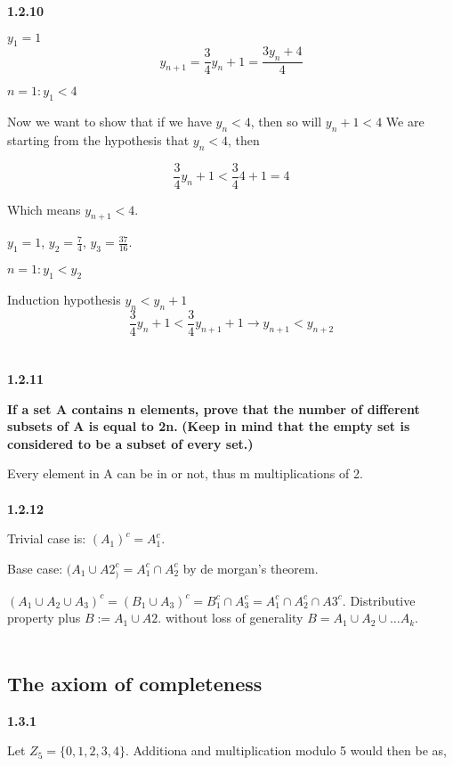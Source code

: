 \textbf{1.2.10}

$y_1 = 1$
$$
y_{n+1} = \frac{3}{4} y_n + 1 = \frac{3y_n + 4}{4}
$$

$n=1: y_1 < 4$

Now we want to show that if we have $y_n < 4$, then so will $y_n+1 < 4$
We are starting from the hypothesis that $y_n < 4$, then

$$
\frac{3}{4} y_n + 1 < \frac{3}{4} 4 + 1 = 4
$$

Which means $y_{n+1} < 4$.

$y_1 = 1$, $y_2 = \frac{7}{4}$, $y_3 = \frac{37}{16}$.

$n=1: y_1 < y_2$

Induction hypothesis $y_n < y_n+1$
$$
\frac{3}{4}  y_n + 1 < \frac{3}{4}  y_{n+1} + 1 \rightarrow y_{n+1} < y_{n+2}
$$
\\~\\



\textbf{1.2.11}

\textbf{If a set A contains n elements, prove that the number of different subsets of A is equal to 2n.}
\textbf{(Keep in mind that the empty set is considered to be a subset of every set.)}

Every element in A can be in or not, thus m multiplications of 2.
\\~\\


\textbf{1.2.12}

Trivial case is: $(A_1)^c  = A_1^c$.

Base case: $(A_1 \cup A2_)^c = A_1^c \cap A_2^c$ by de morgan’s theorem.

$(A_1 \cup A_2 \cup A_3)^c = (B_1 \cup A_3)^c = B_1^c \cap A_3^c = A_1^c \cap A_2^c \cap A3^c$.
Distributive property plus $B := A_1 \cup A2$. 
without loss of generality $B = A_1 \cup A_2 \cup \dots A_k$.
\\~\\



\subsection{The axiom of completeness}

\textbf{1.3.1}

Let $Z_5 = \{0, 1, 2, 3, 4\}$.
Additiona and multiplication modulo 5 would then be as,

